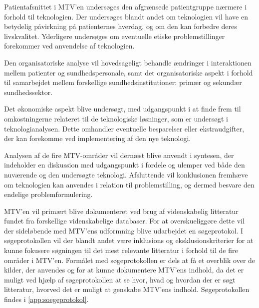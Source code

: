 Patientafsnittet i MTV’en undersøges den afgrænsede patientgruppe nærmere i forhold til teknologien. Der undersøges blandt andet om teknologien vil have en betydelig påvirkning på patienternes hverdag, og om den kan forbedre deres livskvalitet. Yderligere undersøges om eventuelle etiske problemstillinger forekommer ved anvendelse af teknologien.

Den organisatoriske analyse vil hovedsageligt behandle ændringer i interaktionen mellem patienter og sundhedspersonale, samt det organisatoriske aspekt i forhold til samarbejdet mellem forskellige sundhedsinstitutioner: primær og sekundær sundhedssektor.

Det økonomiske aspekt blive undersøgt, med udgangspunkt i at finde frem til omkostningerne relateret til de teknologiske løsninger, som er undersøgt i teknologianalysen. 
Dette omhandler eventuelle besparelser eller ekstraudgifter, der kan forekomme ved implementering af den nye teknologi.

Analysen af de fire MTV-områder vil dernæst blive anvendt i syntesen, der indeholder en diskussion med udgangspunkt i fordele og ulemper ved både den nuværende og den undersøgte teknologi. 
Afsluttende vil konklusionen fremhæve om teknologien kan anvendes i relation til problemstilling, og dermed besvare den endelige problemformulering.

MTV’en vil primært blive dokumenteret ved brug af videnskabelig litteratur fundet fra forskellige videnskabelige databaser. For at overskueliggøre dette vil der sideløbende med MTV’ens udformning blive udarbejdet en søgeprotokol. I søgeprotokollen vil der blandt andet være inklusions og eksklusionskriterier for at kunne fokusere søgningen til det mest relevante litteratur i forhold til de fire områder i MTV’en. Formålet med søgeprotokollen er dels at få et overblik over de kilder, der anvendes og for at kunne dokumentere MTV’ens indhold, da det er muligt ved hjælp af søgeprotokollen at se hvor, hvad og hvordan der er søgt litteratur, hvorved det er muligt at genskabe MTV’ens indhold. Søgeprotokollen findes i \autoref{app:soegeprotokol}.




